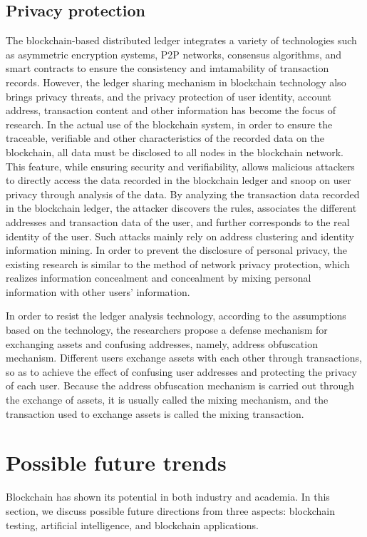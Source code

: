 \documentclass[lettersize,journal]{IEEEtran}
\begin{document}
\subsection{Privacy protection}
The blockchain-based distributed ledger integrates a variety of technologies such as asymmetric encryption systems, P2P networks, consensus algorithms, and smart contracts to ensure the consistency and imtamability of transaction records. However, the ledger sharing mechanism in blockchain technology also brings privacy threats, and the privacy protection of user identity, account address, transaction content and other information has become the focus of research. In the actual use of the blockchain system, in order to ensure the traceable, verifiable and other characteristics of the recorded data on the blockchain, all data must be disclosed to all nodes in the blockchain network. This feature, while ensuring security and verifiability, allows malicious attackers to directly access the data recorded in the blockchain ledger and snoop on user privacy through analysis of the data. By analyzing the transaction data recorded in the blockchain ledger, the attacker discovers the rules, associates the different addresses and transaction data of the user, and further corresponds to the real identity of the user. Such attacks mainly rely on address clustering and identity information mining. In order to prevent the disclosure of personal privacy, the existing research is similar to the method of network privacy protection, which realizes information concealment and concealment by mixing personal information with other users' information.

In order to resist the ledger analysis technology, according to the assumptions based on the technology, the researchers propose a defense mechanism for exchanging assets and confusing addresses, namely, address obfuscation mechanism. Different users exchange assets with each other through transactions, so as to achieve the effect of confusing user addresses and protecting the privacy of each user. Because the address obfuscation mechanism is carried out through the exchange of assets, it is usually called the mixing mechanism, and the transaction used to exchange assets is called the mixing transaction.
\section{Possible future trends}
Blockchain has shown its potential in both industry and academia. In this section, we discuss possible future directions from three aspects: blockchain testing, artificial intelligence, and blockchain applications.
\end{document}
